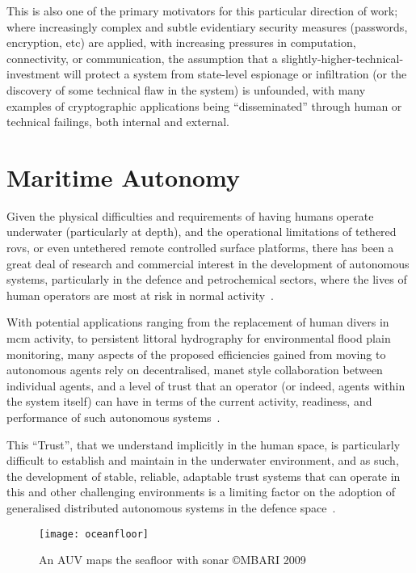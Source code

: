 This is also one of the primary motivators for this particular direction of work; where increasingly complex and subtle evidentiary security measures (passwords, encryption, etc) are applied, with increasing pressures in computation, connectivity, or communication, the assumption that a slightly-higher-technical-investment will protect a system from state-level espionage or infiltration (or the discovery of some technical flaw in the system) is unfounded, with many examples of cryptographic applications being ``disseminated'' through human or technical failings, both internal and external. 

\section{Maritime Autonomy}

Given the physical difficulties and requirements of having humans operate underwater (particularly at depth), and the operational limitations of tethered \glspl{rov}, or even untethered remote controlled surface platforms, there has been a great deal of research and commercial interest in the development of autonomous systems, particularly in the defence and petrochemical sectors, where the lives of human operators are most at risk in normal activity~\cite{Pechoucek:2008:DIA:1355335}.

With potential applications ranging from the replacement of human divers in \gls{mcm} activity, to persistent littoral hydrography for environmental flood plain monitoring, many aspects of the proposed efficiencies gained from moving to autonomous agents rely on decentralised, \gls{manet} style collaboration between individual agents, and a level of trust that an operator (or indeed, agents within the system itself) can have in terms of the current activity, readiness, and performance of such autonomous systems~\cite{Wynn2014}.

This ``Trust'', that we understand implicitly in the human space, is particularly difficult to establish and maintain in the underwater environment, and as such, the development of stable, reliable, adaptable trust systems that can operate in this and other challenging environments is a limiting factor on the adoption of generalised distributed autonomous systems in the defence space~\cite{Caseley2009}.

\begin{figure}[h]
	\centering
	\texttt{[image: oceanfloor]}
	\caption{An AUV maps the seafloor with sonar \copyright MBARI 2009}
\end{figure}


